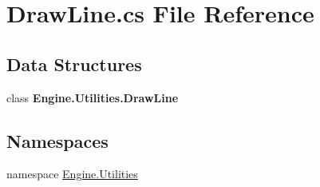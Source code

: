 \hypertarget{a00221}{}\section{Draw\+Line.\+cs File Reference}
\label{a00221}
\subsection*{Data Structures}
\begin{DoxyCompactItemize}
\item 
class {\bfseries Engine.\+Utilities.\+Draw\+Line}
\end{DoxyCompactItemize}
\subsection*{Namespaces}
\begin{DoxyCompactItemize}
\item 
namespace \hyperlink{a00281}{Engine.\+Utilities}
\end{DoxyCompactItemize}
